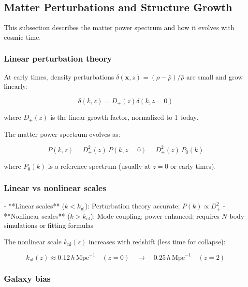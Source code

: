 \subsection{Matter Perturbations and Structure Growth}\label{subsec:ps_matter}

This subsection describes the matter power spectrum and how it evolves with cosmic time.

\subsubsection{Linear perturbation theory}

At early times, density perturbations $\delta(\mathbf{x}, z) = (\rho - \bar{\rho})/\bar{\rho}$ are small and grow linearly:

\begin{equation}
\delta(k, z) = D_+(z) \delta(k, z=0)
\end{equation}

where $D_+(z)$ is the linear growth factor, normalized to 1 today.

The matter power spectrum evolves as:

\begin{equation}
P(k, z) = D_+^2(z) \, P(k, z=0) = D_+^2(z) \, P_0(k)
\end{equation}

where $P_0(k)$ is a reference spectrum (usually at $z=0$ or early times).

\subsubsection{Linear vs nonlinear scales}

- **Linear scales** ($k < k_{\text{nl}}$): Perturbation theory accurate; $P(k) \propto D_+^2$
- **Nonlinear scales** ($k > k_{\text{nl}}$): Mode coupling; power enhanced; requires $N$-body simulations or fitting formulas

The nonlinear scale $k_{\text{nl}}(z)$ increases with redshift (less time for collapse):

\begin{equation}
k_{\text{nl}}(z) \approx 0.12 \, h \, \text{Mpc}^{-1} \quad (z=0) \quad \rightarrow \quad 0.25 \, h \, \text{Mpc}^{-1} \quad (z=2)
\end{equation}

\subsubsection{Galaxy bias}

